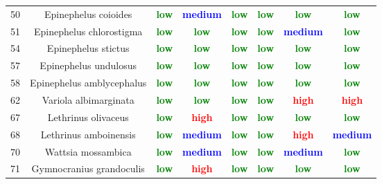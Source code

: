 \documentclass{report}\usepackage[]{graphicx}\usepackage[]{color}
\begin{document}
\begin{table}[ht]
{\begin{tabular}{cccccccc}
   50 & Epinephelus coioides & \textcolor{green}{\textbf{low}} & \textcolor{blue}{\textbf{medium}} & \textcolor{green}{\textbf{low}} & \textcolor{green}{\textbf{low}} & \textcolor{green}{\textbf{low}} & \textcolor{green}{\textbf{low}} \\ 
   51 & Epinephelus chlorostigma & \textcolor{green}{\textbf{low}} & \textcolor{green}{\textbf{low}} & \textcolor{green}{\textbf{low}} & \textcolor{green}{\textbf{low}} & \textcolor{blue}{\textbf{medium}} & \textcolor{green}{\textbf{low}} \\ 
   54 & Epinephelus stictus & \textcolor{green}{\textbf{low}} & \textcolor{green}{\textbf{low}} & \textcolor{green}{\textbf{low}} & \textcolor{green}{\textbf{low}} & \textcolor{green}{\textbf{low}} & \textcolor{green}{\textbf{low}} \\ 
   57 & Epinephelus undulosus & \textcolor{green}{\textbf{low}} & \textcolor{green}{\textbf{low}} & \textcolor{green}{\textbf{low}} & \textcolor{green}{\textbf{low}} & \textcolor{green}{\textbf{low}} & \textcolor{green}{\textbf{low}} \\ 
   58 & Epinephelus amblycephalus & \textcolor{green}{\textbf{low}} & \textcolor{green}{\textbf{low}} & \textcolor{green}{\textbf{low}} & \textcolor{green}{\textbf{low}} & \textcolor{green}{\textbf{low}} & \textcolor{green}{\textbf{low}} \\ 
   62 & Variola albimarginata & \textcolor{green}{\textbf{low}} & \textcolor{green}{\textbf{low}} & \textcolor{green}{\textbf{low}} & \textcolor{green}{\textbf{low}} & \textcolor{red}{\textbf{high}} & \textcolor{red}{\textbf{high}} \\ 
   67 & Lethrinus olivaceus & \textcolor{green}{\textbf{low}} & \textcolor{red}{\textbf{high}} & \textcolor{green}{\textbf{low}} & \textcolor{green}{\textbf{low}} & \textcolor{green}{\textbf{low}} & \textcolor{green}{\textbf{low}} \\ 
   68 & Lethrinus amboinensis & \textcolor{green}{\textbf{low}} & \textcolor{blue}{\textbf{medium}} & \textcolor{green}{\textbf{low}} & \textcolor{green}{\textbf{low}} & \textcolor{red}{\textbf{high}} & \textcolor{blue}{\textbf{medium}} \\ 
   70 & Wattsia mossambica & \textcolor{green}{\textbf{low}} & \textcolor{blue}{\textbf{medium}} & \textcolor{green}{\textbf{low}} & \textcolor{green}{\textbf{low}} & \textcolor{blue}{\textbf{medium}} & \textcolor{green}{\textbf{low}} \\ 
   71 & Gymnocranius grandoculis & \textcolor{green}{\textbf{low}} & \textcolor{red}{\textbf{high}} & \textcolor{green}{\textbf{low}} & \textcolor{green}{\textbf{low}} & \textcolor{green}{\textbf{low}} & \textcolor{green}{\textbf{low}} \\ 

\end{tabular}}
\end{table}
\end{document}
